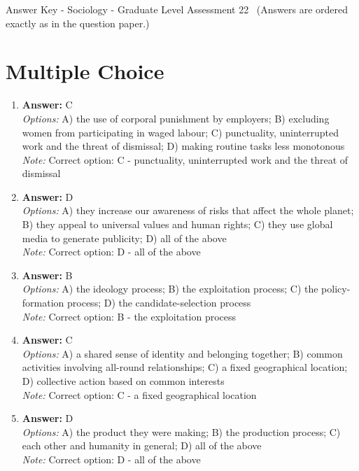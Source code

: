 \documentclass[12pt]{article}
\begin{document}
\begin{center}
Answer Key - Sociology - Graduate Level Assessment 22 \
\small (Answers are ordered exactly as in the question paper.)
\end{center}

\section*{Multiple Choice}
\begin{enumerate}[label=\arabic*.]
\item \textbf{Answer:} C
\\ \textit{Options:} A) the use of corporal punishment by employers; B) excluding women from participating in waged labour; C) punctuality, uninterrupted work and the threat of dismissal; D) making routine tasks less monotonous
\\ \textit{Note:} Correct option: C - punctuality, uninterrupted work and the threat of dismissal
\item \textbf{Answer:} D
\\ \textit{Options:} A) they increase our awareness of risks that affect the whole planet; B) they appeal to universal values and human rights; C) they use global media to generate publicity; D) all of the above
\\ \textit{Note:} Correct option: D - all of the above
\item \textbf{Answer:} B
\\ \textit{Options:} A) the ideology process; B) the exploitation process; C) the policy-formation process; D) the candidate-selection process
\\ \textit{Note:} Correct option: B - the exploitation process
\item \textbf{Answer:} C
\\ \textit{Options:} A) a shared sense of identity and belonging together; B) common activities involving all-round relationships; C) a fixed geographical location; D) collective action based on common interests
\\ \textit{Note:} Correct option: C - a fixed geographical location
\item \textbf{Answer:} D
\\ \textit{Options:} A) the product they were making; B) the production process; C) each other and humanity in general; D) all of the above
\\ \textit{Note:} Correct option: D - all of the above
\end{enumerate}
\end{document}

